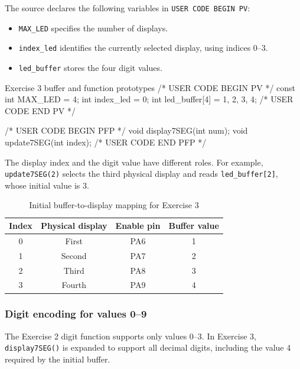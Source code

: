 \documentclass[a4paper]{article}
\begin{document}
The source declares the following variables in
\texttt{USER CODE BEGIN PV}:
\begin{itemize}
    \item \texttt{MAX\_LED} specifies the number of displays.
    \item \texttt{index\_led} identifies the currently
          selected display, using indices 0--3.
    \item \texttt{led\_buffer} stores the four digit values.
\end{itemize}

\begin{stmcode}{Exercise 3 buffer and function prototypes}
/* USER CODE BEGIN PV */
const int MAX_LED = 4;
int index_led = 0;
int led_buffer[4] = {1, 2, 3, 4};
/* USER CODE END PV */

/* USER CODE BEGIN PFP */
void display7SEG(int num);
void update7SEG(int index);
/* USER CODE END PFP */
\end{stmcode}

The display index and the digit value have different
roles. For example, \texttt{update7SEG(2)} selects
the third physical display and reads
\texttt{led\_buffer[2]}, whose initial value is 3.

\begin{table}[H]
    \centering
    \caption{Initial buffer-to-display mapping for Exercise 3}
    \label{tab:ex03-buffer}
    \begin{tabular}{cccc}
        \toprule
        \textbf{Index} &
        \textbf{Physical display} &
        \textbf{Enable pin} &
        \textbf{Buffer value} \\
        \midrule
        0 & First  & PA6 & 1 \\
        1 & Second & PA7 & 2 \\
        2 & Third  & PA8 & 3 \\
        3 & Fourth & PA9 & 4 \\
        \bottomrule
    \end{tabular}
\end{table}

\subsubsection{Digit encoding for values 0--9}

The Exercise 2 digit function supports only values
0--3. In Exercise 3, \texttt{display7SEG()} is
expanded to support all decimal digits, including
the value 4 required by the initial buffer.
\end{document}
